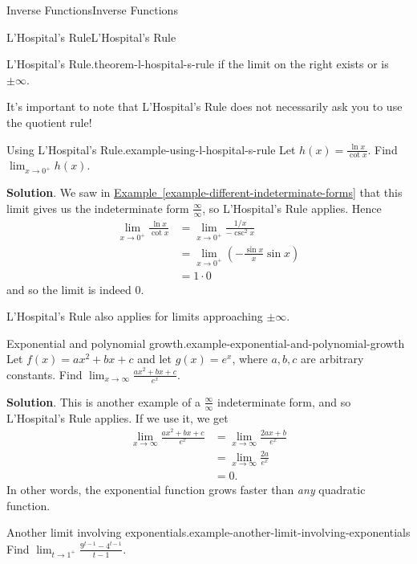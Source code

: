 \documentclass[10pt,]{book}
\numberwithin{equation}{section}
\begin{document}
\begin{chapterptx}{Inverse Functions}{}{Inverse Functions}{}{}
\begin{sectionptx}{L'Hospital's Rule}{}{L'Hospital's Rule}{}{}
\begin{theorem}{L'Hospital's Rule.}{}{theorem-l-hospital-s-rule}
if the limit on the right exists or is \(\pm\infty\).%
\end{theorem}
\hypertarget{p-288}{}%
It's important to note that L'Hospital's Rule does not necessarily ask you to use the quotient rule!%
\begin{example}{Using L'Hospital's Rule.}{example-using-l-hospital-s-rule}%
\hypertarget{p-289}{}%
Let \(h(x) = \frac{\ln x}{\cot x}\). Find \(\lim_{x\to0^{+}}h(x)\).%
\par\smallskip%
\noindent\textbf{Solution}.\hypertarget{solution-63}{}\quad%
\hypertarget{p-290}{}%
We saw in \hyperref[example-different-indeterminate-forms]{Example~\ref{example-different-indeterminate-forms}} that this limit gives us the indeterminate form \(\frac{\infty}{\infty}\), so L'Hospital's Rule applies. Hence%
\begin{align*}
\lim_{x\to0^{+}}\frac{\ln x}{\cot x} & = \lim_{x\to0^{+}}\frac{1/x}{-\csc^{2}x} \\
& = \lim_{x\to0^{+}}\left(-\frac{\sin x}{x}\sin x\right) \\
& = 1\cdot0 
\end{align*}
and so the limit is indeed \(0\).%
\end{example}
\hypertarget{p-291}{}%
L'Hospital's Rule also applies for limits approaching \(\pm\infty\).%
\begin{example}{Exponential and polynomial growth.}{example-exponential-and-polynomial-growth}%
\hypertarget{p-292}{}%
Let \(f(x) = ax^{2} + bx + c\) and let \(g(x) = e^{x}\), where \(a,b,c\) are arbitrary constants. Find \(\lim_{x\to\infty}\frac{ax^{2} + bx + c}{e^{x}}\).%
\par\smallskip%
\noindent\textbf{Solution}.\hypertarget{solution-64}{}\quad%
\hypertarget{p-293}{}%
This is another example of a \(\frac{\infty}{\infty}\) indeterminate form, and so L'Hospital's Rule applies. If we use it, we get%
\begin{align*}
\lim_{x\to\infty}\frac{ax^{2} + bx + c}{e^{x}} & = \lim_{x\to\infty}\frac{2ax+b}{e^{x}} \\
& = \lim_{x\to\infty}\frac{2a}{e^{x}} \\
& = 0. 
\end{align*}
In other words, the exponential function grows faster than \emph{any} quadratic function.%
\end{example}
\begin{example}{Another limit involving exponentials.}{example-another-limit-involving-exponentials}%
\hypertarget{p-294}{}%
Find \(\lim_{t\to1^{+}}\frac{9^{t-1} - 4^{t-1}}{t-1}\).%

\end{example}
\end{sectionptx}
\end{chapterptx}
\end{document}
